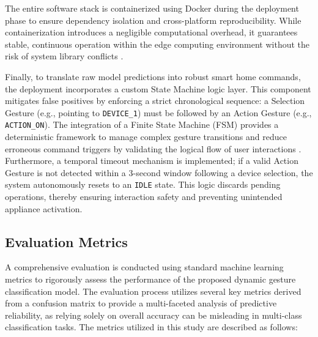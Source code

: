 The entire software stack is containerized using Docker during the deployment phase to ensure dependency isolation and cross-platform reproducibility. While containerization introduces a negligible computational overhead, it guarantees stable, continuous operation within the edge computing environment without the risk of system library conflicts \cite{potdar2020docker}.

Finally, to translate raw model predictions into robust smart home commands, the deployment incorporates a custom State Machine logic layer. This component mitigates false positives by enforcing a strict chronological sequence: a Selection Gesture (e.g., pointing to \texttt{DEVICE\_1}) must be followed by an Action Gesture (e.g., \texttt{ACTION\_ON}). The integration of a Finite State Machine (FSM) provides a deterministic framework to manage complex gesture transitions and reduce erroneous command triggers by validating the logical flow of user interactions \cite{noparlik2023hand}. Furthermore, a temporal timeout mechanism is implemented; if a valid Action Gesture is not detected within a 3-second window following a device selection, the system autonomously resets to an \texttt{IDLE} state. This logic discards pending operations, thereby ensuring interaction safety and preventing unintended appliance activation.



\subsection{Evaluation Metrics}

A comprehensive evaluation is conducted using standard machine learning metrics to rigorously assess the performance of the proposed dynamic gesture classification model. The evaluation process utilizes several key metrics derived from a confusion matrix to provide a multi-faceted analysis of predictive reliability, as relying solely on overall accuracy can be misleading in multi-class classification tasks. The metrics utilized in this study are described as follows:

